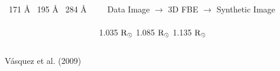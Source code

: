 \documentclass{beamer}
\begin{document}
\begin{frame}%

\vspace{-0.35cm}
\begin{columns}
\noindent
{}
\vskip 0.8cm
{\footnotesize
\ 171 \AA
\vskip 1.75cm
\ 195 \AA
\vskip 1.65cm
\ 284 \AA
}
\column{\textwidth}
\begin{center}
{\footnotesize
\ \ Data Image \hfill $\rightarrow$ \hfill 3D FBE \hfill $\rightarrow$ \hfill Synthetic Image\ \ \ \
}\\
\\
\footnotesize
 1.035 ${\rm R_\odot}$ \hskip 1cm 1.085 ${\rm R_\odot}$ \hskip 1cm 1.135 ${\rm R_\odot}$ \hfil
\end{center}
\end{columns}
\begin{columns}
 Vásquez et al. (2009)
\end{columns}
\end{frame}

\end{document}
